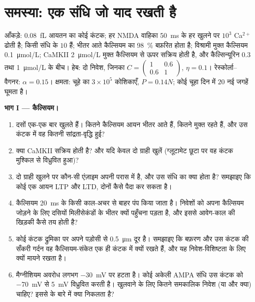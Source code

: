 \section{समस्या: एक संधि जो याद रखती है}

\begin{problem}
\label{pb:b3:learning-memory:1}
आँकड़े: \qty{0.08}{fL} आयतन का कोई कंटक; हर NMDA वाहिका \qty{50}{ms}
के हर खुलने पर $10^{3}$ Ca$^{2+}$ ढोती है; किसी संधि के $10$  हैं; भीतर आते कैल्सियम का \qty{98}{\%} बफ़रित होता है; विश्रामी
मुक्त कैल्सियम \qty{0.1}{\micro mol/L}; CaMKII
\qty{2}{\micro mol/L} मुक्त कैल्सियम से ऊपर सक्रिय होती है, और
कैल्सिन्यूरिन $0.3$ तथा
\qty{1}{\micro mol/L} के बीच। हेब: दो निवेश, जिनका $C = \begin{pmatrix}1 &
0.6\\ 0.6 & 1\end{pmatrix}$, $\eta = 0.1$। रेस्कोर्ला--वैगनर: $\alpha =
0.15$। क्षमता: चूहे का  $3\times 10^{5}$ कोशिकाएँ, $P = 0.14N$; कोई
चूहा दिन में $20$ नई जगहें घूमता है।

\medskip
\noindent\textbf{भाग I --- कैल्सियम।}
\begin{enumerate}
  \item दसों  एक-एक बार खुलते हैं। कितने कैल्सियम आयन भीतर
        आते हैं, कितने मुक्त रहते हैं, और उस कंटक में वह कितनी
        सांद्रता-वृद्धि हुई?
  \item क्या CaMKII सक्रिय होती है? और यदि केवल दो ग्राही खुलें
        (ग्लूटामेट छूटा पर वह कंटक मुश्किल से विध्रुवित हुआ)?
  \item दो ग्राही खुलने पर कौन-सी एंज़ाइम अपनी परास में है, और उस संधि
        का क्या होता है? समझाइए कि कोई एक आयन LTP और LTD, दोनों कैसे
        पैदा कर सकता है।
  \item कैल्सियम \qty{20}{ms} के किसी काल-अचर से बाहर पंप किया जाता
        है। निवेशों को अपना कैल्सियम जोड़ने के लिए दसियों मिलीसेकंडों
        के भीतर क्यों पहुँचना पड़ता है, और इससे आवेग-काल की खिड़की कैसे
        तय होती है?
  \item कोई कंटक द्रुमिका पर अपने पड़ोसी से \qty{0.5}{\micro m} दूर
        है। समझाइए कि बफ़रण और उस कंटक की सँकरी गर्दन वह कैल्सियम-संकेत
        एक ही कंटक में क्यों रखते हैं, और यह निवेश-विशिष्टता के लिए
        क्यों मायने रखता है।
  \item मैग्नीशियम अवरोध लगभग \qty{-30}{mV} पर हटता है। कोई अकेली AMPA
        संधि उस कंटक को \qty{-70}{mV} से \qty{5}{mV} विध्रुवित करती
        है।  खुलवाने के लिए कितने समकालिक निवेश (या और क्या)
        चाहिए? इससे  के बारे में क्या निकलता है?
\end{enumerate}


\end{problem}
